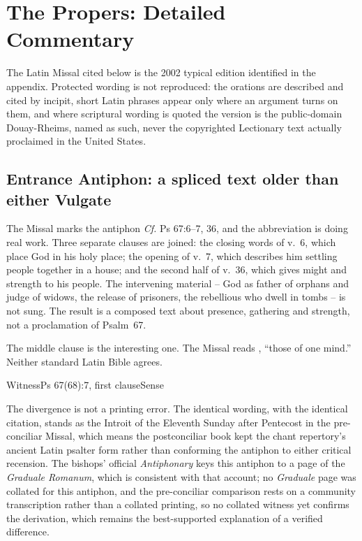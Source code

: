 \section*{The Propers: Detailed Commentary}

The Latin Missal cited below is the 2002 typical edition identified in the appendix. Protected wording is not reproduced: the orations are described and cited by incipit, short Latin phrases appear only where an argument turns on them, and where scriptural wording is quoted the version is the public-domain Douay-Rheims, named as such, never the copyrighted Lectionary text actually proclaimed in the United States.

\subsection*{Entrance Antiphon: a spliced text older than either Vulgate}

The Missal marks the antiphon \emph{Cf.} Ps 67:6--7, 36, and the abbreviation is doing real work. Three separate clauses are joined: the closing words of v.~6, which place God in his holy place; the opening of v.~7, which describes him settling people together in a house; and the second half of v.~36, which gives might and strength to his people. The intervening material -- God as father of orphans and judge of widows, the release of prisoners, the rebellious who dwell in tombs -- is not sung. The result is a composed text about presence, gathering and strength, not a proclamation of Psalm~67.

The middle clause is the interesting one. The Missal reads , ``those of one mind.'' Neither standard Latin Bible agrees.

\begin{threecoltable}{Witness}{Ps 67(68):7, first clause}{Sense}
\end{threecoltable}

The divergence is not a printing error. The identical wording, with the identical citation, stands as the Introit of the Eleventh Sunday after Pentecost in the pre-conciliar Missal, which means the postconciliar book kept the chant repertory's ancient Latin psalter form rather than conforming the antiphon to either critical recension. The bishops' official \emph{Antiphonary} keys this antiphon to a page of the \emph{Graduale Romanum}, which is consistent with that account; no \emph{Graduale} page was collated for this antiphon, and the pre-conciliar comparison rests on a community transcription rather than a collated printing, so no collated witness yet confirms the derivation, which remains the best-supported explanation of a verified difference.

